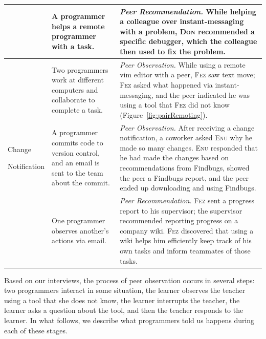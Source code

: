 \documentclass[smallextended]{svjour3}
\newcommand\DiscPush{Peer Recommendation\xspace}
\newcommand\discpull{peer observation\xspace}
\newcommand\DiscPull{Peer Observation\xspace}
\newcommand{\subject}[1]{\textsc{#1}}
\newcommand{\hsub}{{\subject{Fez}}\xspace}
\newcommand{\msub}{{\subject{Don}}\xspace}
\newcommand{\osub}{{\subject{Ken}}\xspace}
\newcommand{\qsub}{{\subject{Enu}}\xspace}
\begin{document}
\begin{table}[tbp]
\begin{tabularx}{\linewidth}{p{19mm}|p{30mm}|X}
		\ctxHelpRemote & 
		A programmer helps a remote programmer with a task. &
		\emph{\DiscPush.}
		While helping a colleague over instant-messaging with a problem, \msub
		recommended a specific debugger, which the colleague then used to fix the
		problem.\\
		\hline
 		
		\ctxPairRemote & 
		Two programmers work at different computers and
		collaborate to complete a task. & 
		\emph{\DiscPull.}
		While using a remote vim editor with a peer, \hsub saw text move; \hsub
		asked what happened via instant-messaging, 
		and the peer indicated he was using a tool that \hsub did not know
		(Figure~\ref{fig:pairRemoting}).\\
		\hline
 		
 		Change\par Notification & A programmer commits code to version
 		control, and an email is sent to the team about the commit.& 
 		\emph{\DiscPull.}
 		After receiving a change notification, a coworker asked \qsub why he made so
 		many changes.
 		\qsub responded that he had made the changes based on recommendations from
 		Findbugs, showed the peer a Findbugs report, and the peer ended up
 		downloading and using Findbugs.\\
		\hline
 		
		\ctxEmail & 
		One programmer observes another's actions via email. & 
		\emph{\DiscPush.}
		\hsub sent a progress report to his supervisor; 
		the supervisor recommended reporting progress on a company
		wiki. \hsub discovered that using a wiki helps him efficiently
		keep track of his own tasks and inform teammates of those tasks. \\
        
	\end{tabularx}

\end{table}


\noindent
Based on our interviews, the process of \discpull occurs in several steps: 
two programmers interact in some situation,
the learner observes the teacher using a tool that she does not know,
the learner interrupts the teacher,
the learner asks a question about the tool,
and then the teacher responds to the learner.
In what follows, we describe what programmers told us happens during each of
these stages.
\end{document}
